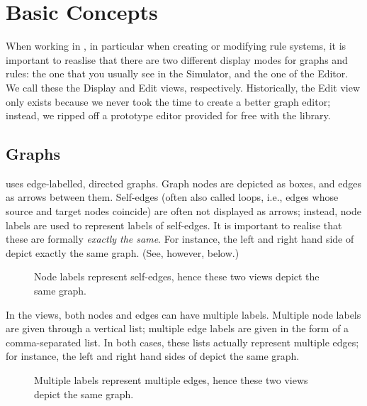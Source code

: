 \section{Basic Concepts}

When working in \Groove{}, in particular when creating or modifying rule
systems, it is important to reaslise that there are two different display modes
for graphs and rules: the one that you usually see in the Simulator, and the
one of the Editor. We call these the Display and Edit views, respectively.
Historically, the Edit view only exists because we never took the time to
create a better graph editor; instead, we ripped off a prototype editor
provided for free with the \JGraph{} library.

\subsection{Graphs}

\Groove{} uses edge-labelled, directed graphs. Graph nodes are depicted as
boxes, and edges as arrows between them. Self-edges (often also called loops,
i.e., edges whose source and target nodes coincide) are often not displayed as
arrows; instead, node labels are used to represent labels of self-edges. It is
important to realise that these are formally \emph{exactly the same}. For
instance, the left and right hand side of  depict exactly the
same graph. (See, however,  below.)

\begin{figure}[h]
\begin{center}
\qquad
\end{center}
\caption{Node labels represent self-edges, hence these two views depict the
same graph.}
\end{figure}

In the \Groove{} views, both nodes and edges can have multiple labels. Multiple
node labels are given through a vertical list; multiple edge labels are given
in the form of a comma-separated list. In both cases, these lists actually
represent multiple edges; for instance, the left and right hand sides of
 depict the same graph.

\begin{figure}[h]
\begin{center}
\qquad
{}
\end{center}
\caption{Multiple labels represent multiple edges, hence these two views depict
the same graph.}
\end{figure}

